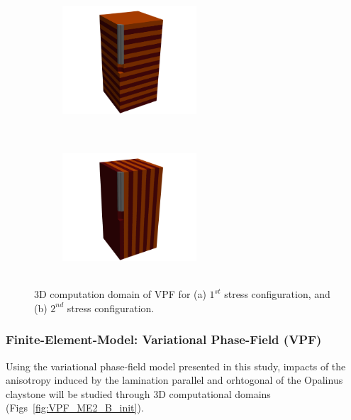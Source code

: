 \begin{figure}[!ht]
\label{fig:VPF_ME2_B_init}
\begin{subfigure}[c]{0.48\textwidth}
\centering
\includegraphics[width=5cm,height=5cm]{figures/ME2b_init_para.png}
\subcaption{}
\end{subfigure}
\hfill
\begin{subfigure}[c]{0.48\textwidth}
\centering
\includegraphics[width=5cm,height=5cm]{figures/ME2b_init_orth.png}
\subcaption{}
\end{subfigure}
\caption{3D computation domain of VPF for (a) $1^{st}$ stress configuration, and (b) $2^{nd}$ stress configuration.}
\end{figure}

\subsubsection*{Finite-Element-Model: Variational Phase-Field (VPF)}
Using the variational phase-field model presented in this study, impacts of the anisotropy induced by the lamination parallel and orhtogonal of the Opalinus claystone will be studied through 3D computational domains (Figs~\ref{fig:VPF_ME2_B_init}).



